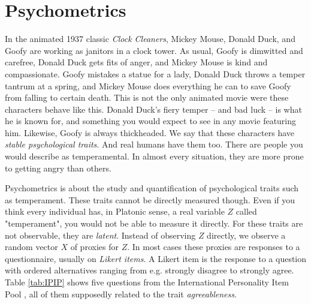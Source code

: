 
\section{Psychometrics}
In the animated 1937 classic \textit{Clock Cleaners}, Mickey Mouse, Donald Duck, and Goofy are working as janitors in a clock tower. As usual, Goofy is dimwitted and carefree, Donald Duck gets fits of anger, and Mickey Mouse is kind and compassionate. Goofy mistakes a statue for a lady, Donald Duck throws a temper tantrum at a spring, and Mickey Mouse does everything he can to save Goofy from falling to certain death. This is not the only animated movie were these characters behave like this. Donald Duck's fiery temper -- and bad luck -- is what he is known for, and something you would expect to see in any movie featuring him. Likewise, Goofy is always thickheaded. We say that these characters have \textit{stable psychological traits}. And real humans have them too. There are people you would describe as temperamental. In almost every situation, they are more prone to getting angry than others.

Psychometrics is about the study and quantification of psychological traits such as temperament. These traits cannot be directly measured though. Even if you think every individual has, in Platonic sense, a real variable $Z$ called "temperament", you would not be able to measure it directly. For these traits are not observable, they are \textit{latent}. Instead of observing $Z$ directly, we observe a random vector $X$ of proxies for $Z$. In most cases these proxies are responses to a questionnaire, usually on \emph{Likert items}. A Likert item is the response to a question with ordered alternatives ranging from e.g. strongly disagree to strongly agree. Table \ref{tab:IPIP} shows five questions from the International Personality Item Pool \parencite{Goldberg1992-hp}, all of them supposedly related to the trait \textit{agreeableness}.

